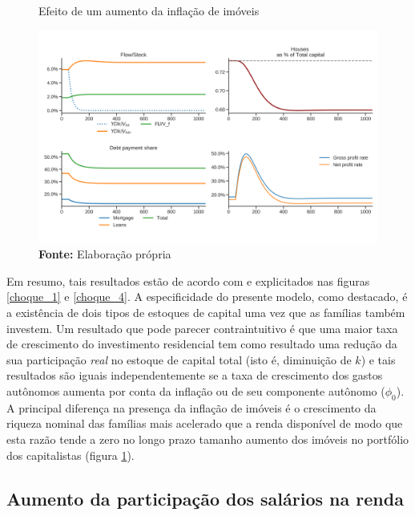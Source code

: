 \begin{figure}[H]
	\centering
	\caption{Efeito de um aumento da inflação de imóveis}
	\label{choque_4Norms}
	\includegraphics[width=\textwidth]{../../Modelo/Versoes/Shock_4Norms.png}
	\caption*{\textbf{Fonte:} Elaboração própria}
\end{figure}


Em resumo, tais resultados estão de acordo com \textcite{freitas_growth_2015} e explicitados nas figuras \ref{choque_1} e \ref{choque_4}. A especificidade do presente modelo, como destacado, é a existência de dois tipos de estoques de capital uma vez que as famílias também investem. Um resultado que pode parecer contraintuitivo é que uma maior taxa de crescimento do investimento residencial tem como resultado uma redução  da sua participação \textit{real} no estoque de capital total (isto é, diminuição de $k$) e tais resultados são iguais independentemente se a taxa de crescimento dos gastos autônomos aumenta por conta da inflação ou de seu componente autônomo ($\phi_0$). 
A principal diferença na presença da inflação de imóveis é o crescimento da riqueza nominal das famílias mais acelerado que a renda disponível de modo que esta razão tende a zero no longo prazo tamanho aumento dos imóveis no portfólio dos capitalistas (figura \ref{choque_4Norms}).

\subsection*{Aumento da participação dos salários na renda}

